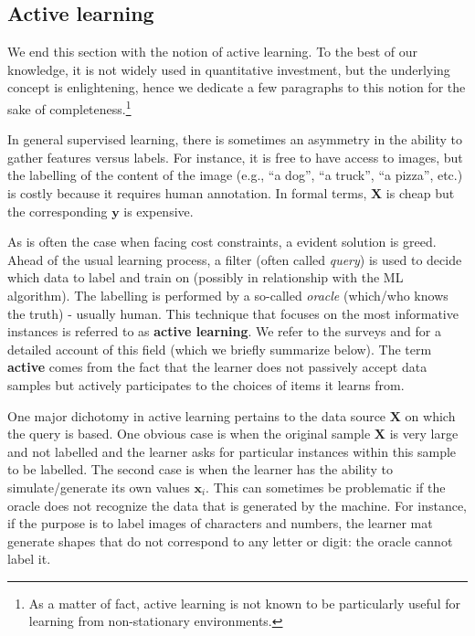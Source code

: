 \documentclass[]{krantz}
\let\rmarkdownfootnote\footnote%
\def\footnote{\protect\rmarkdownfootnote}
\theoremstyle{definition}
\theoremstyle{definition}
\theoremstyle{definition}
\theoremstyle{remark}
\begin{document}
\hypertarget{active-learning}{%
\subsection{Active learning}\label{active-learning}}

We end this section with the notion of active learning. To the best of
our knowledge, it is not widely used in quantitative investment, but the
underlying concept is enlightening, hence we dedicate a few paragraphs
to this notion for the sake of completeness.\footnote{As a matter of
  fact, active learning is not known to be particularly useful for
  learning from non-stationary environments.}

In general supervised learning, there is sometimes an asymmetry in the
ability to gather features versus labels. For instance, it is free to
have access to images, but the labelling of the content of the image
(e.g., ``a dog'', ``a truck'', ``a pizza'', etc.) is costly because it
requires human annotation. In formal terms, \(\textbf{X}\) is cheap but
the corresponding \(\textbf{y}\) is expensive.

As is often the case when facing cost constraints, a evident solution is
greed. Ahead of the usual learning process, a filter (often called
\emph{query}) is used to decide which data to label and train on
(possibly in relationship with the ML algorithm). The labelling is
performed by a so-called \emph{oracle} (which/who knows the truth) -
usually human. This technique that focuses on the most informative
instances is referred to as \textbf{active learning}. We refer to the
surveys \citet{settles2009active} and \citet{settles2012active} for a
detailed account of this field (which we briefly summarize below). The
term \textbf{active} comes from the fact that the learner does not
passively accept data samples but actively participates to the choices
of items it learns from.

One major dichotomy in active learning pertains to the data source
\(\textbf{X}\) on which the query is based. One obvious case is when the
original sample \(\textbf{X}\) is very large and not labelled and the
learner asks for particular instances within this sample to be labelled.
The second case is when the learner has the ability to simulate/generate
its own values \(\textbf{x}_i\). This can sometimes be problematic if
the oracle does not recognize the data that is generated by the machine.
For instance, if the purpose is to label images of characters and
numbers, the learner mat generate shapes that do not correspond to any
letter or digit: the oracle cannot label it.
\end{document}
